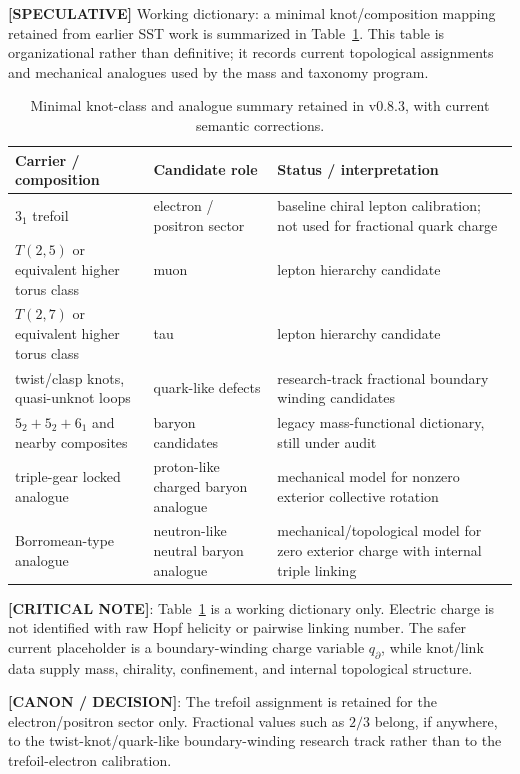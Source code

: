         \textbf{[SPECULATIVE]} Working dictionary: a minimal knot/composition mapping retained from earlier SST work is summarized in Table~\ref{tab:particle_candidate_mapping}. This table is organizational rather than definitive; it records current topological assignments and mechanical analogues used by the mass and taxonomy program.

        \begin{table}[h]
        \centering
        \caption{Minimal knot-class and analogue summary retained in v0.8.3, with current semantic corrections.}
        \label{tab:particle_candidate_mapping}
        \begin{tabular}{lll}
        \hline
        Carrier / composition & Candidate role & Status / interpretation \\
        \hline
        $3_1$ trefoil & electron / positron sector & baseline chiral lepton calibration; not used for fractional quark charge \\
        $T(2,5)$ or equivalent higher torus class & muon & lepton hierarchy candidate \\
        $T(2,7)$ or equivalent higher torus class & tau & lepton hierarchy candidate \\
        twist/clasp knots, quasi-unknot loops & quark-like defects & research-track fractional boundary winding candidates \\
        $5_2+5_2+6_1$ and nearby composites & baryon candidates & legacy mass-functional dictionary, still under audit \\
        triple-gear locked analogue & proton-like charged baryon analogue & mechanical model for nonzero exterior collective rotation \\
        Borromean-type analogue & neutron-like neutral baryon analogue & mechanical/topological model for zero exterior charge with internal triple linking \\
        \hline
        \end{tabular}
        \end{table}

        \textbf{[CRITICAL NOTE]}: Table~\ref{tab:particle_candidate_mapping} is a working dictionary only. Electric charge is not identified with raw Hopf helicity or pairwise linking number. The safer current placeholder is a boundary-winding charge variable $q_{\partial}$, while knot/link data supply mass, chirality, confinement, and internal topological structure.

        \textbf{[CANON / DECISION]}: The trefoil assignment is retained for the electron/positron sector only. Fractional values such as $2/3$ belong, if anywhere, to the twist-knot/quark-like boundary-winding research track rather than to the trefoil-electron calibration.
